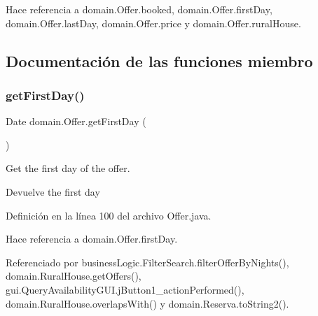 Hace referencia a domain.\+Offer.\+booked, domain.\+Offer.\+first\+Day, domain.\+Offer.\+last\+Day, domain.\+Offer.\+price y domain.\+Offer.\+rural\+House.



\subsection{Documentación de las funciones miembro}
\mbox{\label{classdomain_1_1_offer_ae13ac55ba469cb34e004d6aff68430fb}} 
\subsubsection{\texorpdfstring{getFirstDay()}{getFirstDay()}}
{\footnotesize\ttfamily Date domain.\+Offer.\+get\+First\+Day (\begin{DoxyParamCaption}{ }\end{DoxyParamCaption})}



Get the first day of the offer. 

\begin{DoxyReturn}{Devuelve}
the first day 
\end{DoxyReturn}


Definición en la línea 100 del archivo Offer.\+java.


\begin{DoxyCode}{0}

\end{DoxyCode}


Hace referencia a domain.\+Offer.\+first\+Day.



Referenciado por business\+Logic.\+Filter\+Search.\+filter\+Offer\+By\+Nights(), domain.\+Rural\+House.\+get\+Offers(), gui.\+Query\+Availability\+G\+U\+I.\+j\+Button1\+\_\+action\+Performed(), domain.\+Rural\+House.\+overlaps\+With() y domain.\+Reserva.\+to\+String2().

\mbox{\label{classdomain_1_1_offer_a8bf48365a8fc185dbdcaac80a9d84444}} 
